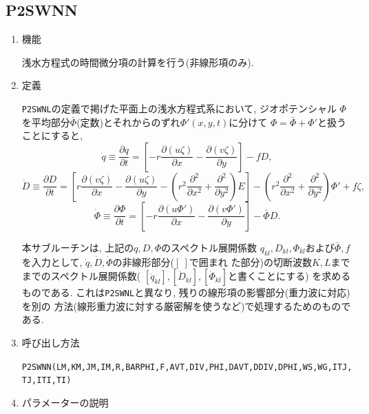 \documentclass[a4j,fleqn]{jarticle}
\begin{document}
\subsection{P2SWNN}

\begin{enumerate}

\item 機能 

浅水方程式の時間微分項の計算を行う(非線形項のみ).

\item 定義

{\tt P2SWNL}の定義で掲げた平面上の浅水方程式系において, ジオポテンシャル
$\Phi$を平均部分$\bar\Phi$(定数)とそれからのずれ$\Phi'(x,y,t)$に分けて
$\Phi=\bar\Phi+\Phi'$と扱うことにすると, 
\begin{equation}
\dot{q}\equiv\frac{\partial q}{\partial t}
=\left[-r\frac{\partial(u\zeta)}{\partial x}
 -\frac{\partial(v\zeta)}{\partial y}\right]-fD,
\end{equation}
\begin{equation}
\dot{D}\equiv\frac{\partial D}{\partial t}
=\left[r\frac{\partial(v\zeta)}{\partial x}
-\frac{\partial(u\zeta)}{\partial y}
 -\left(r^2\frac{\partial^2}{\partial x^2}
  +\frac{\partial^2}{\partial y^2}\right) E\right]
 -\left(r^2\frac{\partial^2}{\partial x^2}
  +\frac{\partial^2}{\partial y^2}\right)\Phi'+f\zeta,
\end{equation}
\begin{equation}
\dot{\Phi}\equiv\frac{\partial \Phi}{\partial t}
=\left[-r\frac{\partial(u\Phi')}{\partial x}
-\frac{\partial(v\Phi')}{\partial y}\right]-\bar\Phi D.
\end{equation}

本サブルーチンは, 上記の$q,D,\Phi$のスペクトル展開係数
$q_{kl},D_{kl},\Phi_{kl}$および$\bar\Phi,f$を入力として,
$\dot{q},\dot{D},\dot{\Phi}$の非線形部分($\left[\ \right]$で囲まれ
た部分)の切断波数$K,L$までまでのスペクトル展開係数(
$[ \dot{q}_{kl}],[\dot{D}_{kl}],[\dot{\Phi}_{kl}]$と書くことにする)
を求めるものである.
これは{\tt P2SWNL}と異なり, 残りの線形項の影響部分(重力波に対応)を別の
方法(線形重力波に対する厳密解を使うなど)で処理するためのものである.

\item 呼び出し方法 

{\tt P2SWNN(LM,KM,JM,IM,R,BARPHI,F,AVT,DIV,PHI,DAVT,DDIV,DPHI,WS,WG,ITJ,TJ,ITI,TI)}

\item パラメーターの説明


\end{enumerate}
\end{document}
